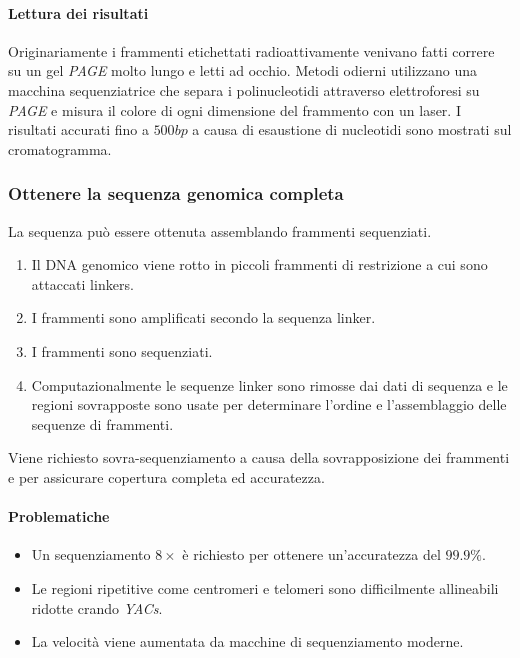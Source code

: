 			\paragraph{Lettura dei risultati}
			Originariamente i frammenti etichettati radioattivamente venivano fatti correre su un gel \emph{PAGE} molto lungo e letti ad occhio.
			Metodi odierni utilizzano una macchina sequenziatrice che separa i polinucleotidi attraverso elettroforesi su \emph{PAGE} e misura il colore di ogni dimensione del frammento con un laser.
			I risultati accurati fino a $500bp$ a causa di esaustione di nucleotidi sono mostrati sul cromatogramma.

		\subsubsection{Ottenere la sequenza genomica completa}
		La sequenza pu\`o essere ottenuta assemblando frammenti sequenziati.
		\begin{multicols}{2}
			\begin{enumerate}
				\item Il DNA genomico viene rotto in piccoli frammenti di restrizione a cui sono attaccati linkers.
				\item I frammenti sono amplificati secondo la sequenza linker.
				\item I frammenti sono sequenziati.
				\item Computazionalmente le sequenze linker sono rimosse dai dati di sequenza e le regioni sovrapposte sono usate per determinare l'ordine e l'assemblaggio delle sequenze di frammenti.
			\end{enumerate}
		\end{multicols}
		Viene richiesto sovra-sequenziamento a causa della sovrapposizione dei frammenti e per assicurare copertura completa ed accuratezza.

			\paragraph{Problematiche}
			\begin{multicols}{2}
				\begin{itemize}
					\item Un sequenziamento $8\times$ \`e richiesto per ottenere un'accuratezza del $99.9\%$.
					\item Le regioni ripetitive come centromeri e telomeri sono difficilmente allineabili ridotte crando \emph{YACs}.
					\item La velocit\`a viene aumentata da macchine di sequenziamento moderne.
				\end{itemize}
			\end{multicols}

